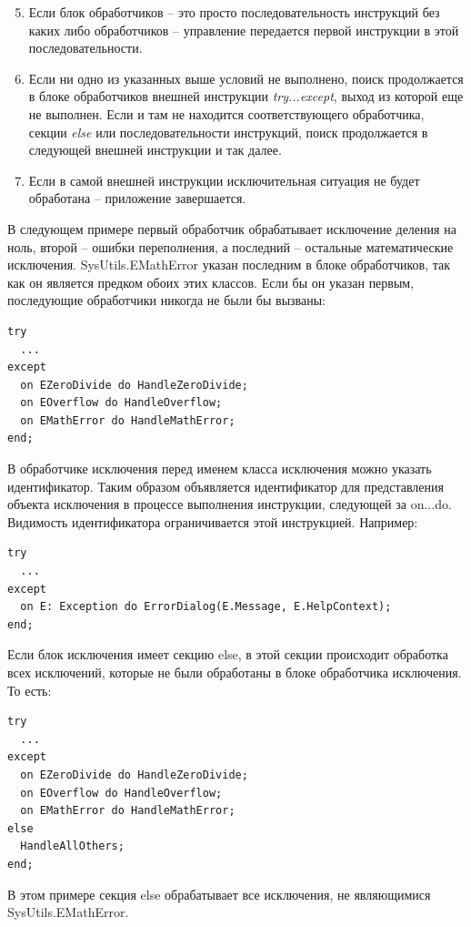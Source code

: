 \documentclass[xcolor=table]{beamer}
\begin{document}
\begin{frame}
	\begin{enumerate}
		\setcounter{enumi}{4}
		\item Если блок обработчиков – это просто последовательность инструкций без каких либо обработчиков – управление передается первой инструкции в этой последовательности.
		\item Если ни одно из указанных выше условий не выполнено, поиск продолжается в блоке обработчиков внешней инструкции \textit{try...except}, выход из которой еще не выполнен. Если и там не находится соответствующего обработчика, секции \textit{else} или последовательности инструкций, поиск продолжается в следующей внешней инструкции и так далее. 
		\item Если в самой внешней инструкции исключительная ситуация не будет обработана – приложение завершается.
	\end{enumerate}
\end{frame}

\begin{frame}[fragile]
	В следующем примере первый обработчик обрабатывает исключение деления на ноль, второй – ошибки переполнения, а последний – остальные математические исключения. SysUtils.EMathError указан последним в блоке обработчиков, так как он является предком обоих этих классов. Если бы он указан первым, последующие обработчики никогда не были бы вызваны:
	\begin{verbatim}
try
  ...
except
  on EZeroDivide do HandleZeroDivide;
  on EOverflow do HandleOverflow;
  on EMathError do HandleMathError;
end;
	\end{verbatim}
\end{frame}

\begin{frame}[fragile]
	В обработчике исключения перед именем класса исключения можно указать идентификатор. Таким образом объявляется идентификатор для представления объекта исключения в процессе выполнения инструкции, следующей за on...do. Видимость идентификатора ограничивается этой инструкцией. Например:
	\begin{verbatim}
try
  ...
except
  on E: Exception do ErrorDialog(E.Message, E.HelpContext);
end;
	\end{verbatim}
\end{frame}

\begin{frame}[fragile]
	Если блок исключения имеет секцию else, в этой секции происходит обработка всех исключений, которые не были обработаны в блоке обработчика исключения. То есть:
	\begin{verbatim}
try
  ...
except
  on EZeroDivide do HandleZeroDivide;
  on EOverflow do HandleOverflow;
  on EMathError do HandleMathError;
else
  HandleAllOthers;
end;
	\end{verbatim}
	В этом примере секция else обрабатывает все исключения, не являющимися SysUtils.EMathError.
\end{frame}
\end{document}
